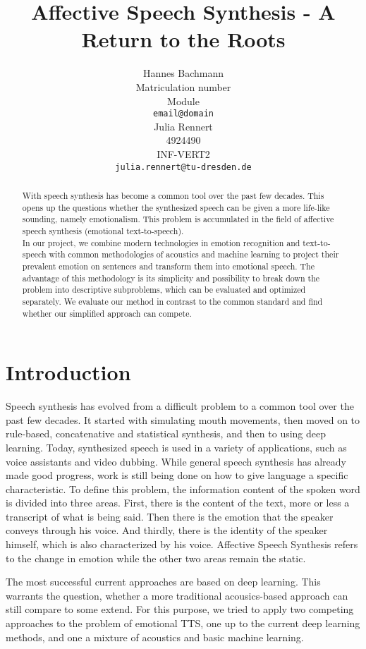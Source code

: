 \documentclass[11pt]{article}
\title{Affective Speech Synthesis - A Return to the Roots}
\author{Hannes Bachmann\\
  Matriculation number\\
  Module \\
  \texttt{email@domain} 
  \\\And
  Julia Rennert \\
  4924490\\
  INF-VERT2 \\
  \texttt{julia.rennert@tu-dresden.de}
  }
\begin{document}
\maketitle
\begin{abstract}
With speech synthesis has become a common tool over the past few decades. This opens up the questions whether the synthesized speech can be given a more life-like sounding, namely emotionalism. This problem is accumulated in the field of affective speech synthesis (emotional text-to-speech). \\
In our project, we combine modern technologies in emotion recognition and text-to-speech with common methodologies of acoustics and machine learning to project their prevalent emotion on sentences and transform them into emotional speech. The advantage of this methodology is its simplicity and possibility to break down the problem into descriptive subproblems, which can be evaluated and optimized separately. We evaluate our method in contrast to the common standard and find whether our simplified approach can compete.
\end{abstract}

\section{Introduction}
Speech synthesis has evolved from a difficult problem to a common tool over the past few decades.
It started with simulating mouth movements, then moved on to rule-based, concatenative and
statistical synthesis, and then to using deep learning. Today, synthesized speech is used in a
variety of applications, such as voice assistants and video dubbing.
While general speech synthesis has already made good progress, work is still being done on
how to give language a specific characteristic. To define this problem, the information content of
the spoken word is divided into three areas. First, there is the content of the text, more or less
a transcript of what is being said. Then there is the emotion that the speaker conveys through
his voice. And thirdly, there is the identity of the speaker himself, which is also characterized by
his voice. Affective Speech Synthesis refers to the change in emotion while the other two areas remain the static.

The most successful current approaches are based on deep learning. This warrants the question, whether a more traditional acousics-based approach can still compare to some extend. For this purpose, we tried to apply two competing approaches to the problem of emotional TTS, one up to the current deep learning methods, and one a mixture of acoustics and basic machine learning. 
\end{document}
